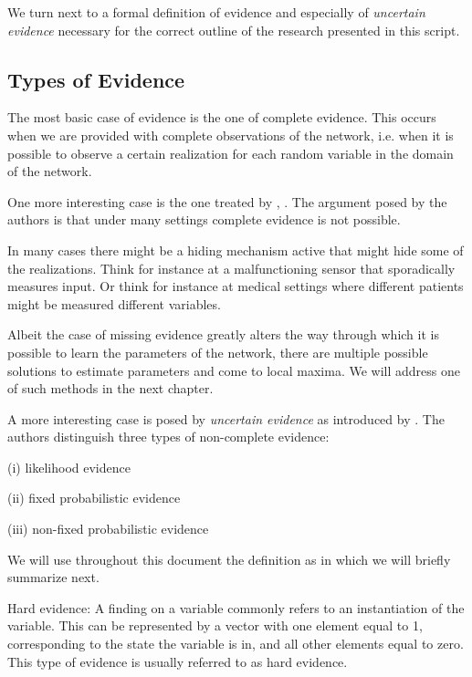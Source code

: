 \documentclass[11pt]{article}
\begin{document}
\begin{article}
We turn next to a formal definition of evidence and especially of
\emph{uncertain evidence} necessary for the correct outline of the
research presented in this script.

\subsection{Types of Evidence}
\label{sec:org43b2a87}

The most basic case of evidence is the one of complete
evidence. This occurs when we are provided with complete
observations of the network, i.e.  when it is possible to observe a
certain realization for each random variable in the domain of the
network.

One more interesting case is the one treated by \cite{Mrad_2015},
\cite{Wasserkrug_all}. The argument posed by the authors is that under
many settings complete evidence is not possible.

In many cases there might be a hiding mechanism active that might
hide some of the realizations. Think for instance at a
malfunctioning sensor that sporadically measures input. Or think for
instance at medical settings where different patients might be
measured different variables.

Albeit the case of missing evidence greatly alters the way through
which it is possible to learn the parameters of the network, there
are multiple possible solutions to estimate parameters and come to
local maxima. We will address one of such methods in the next
chapter.

A more interesting case is posed by \emph{uncertain evidence} as
introduced by \cite{Mrad_2015}. The authors distinguish three types of
non-complete evidence:

(i) likelihood evidence

(ii) fixed probabilistic evidence

(iii) non-fixed probabilistic evidence

We will use throughout this document the definition as in
\cite{Mrad_2015} which we will briefly summarize next.

\begin{definition}
Hard evidence: A finding on a variable commonly refers to an
instantiation of the variable. This can be represented by a vector
with one element equal to 1, corresponding to the state the variable
is in, and all other elements equal to zero. This type of evidence
is usually referred to as hard evidence.
\end{definition}


\end{article}
\end{document}
